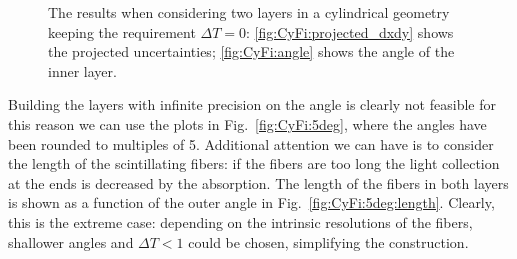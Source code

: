 \begin{refsection}
        \begin{figure}[ht]   
            \centering
            \hfill
            \caption{The results when considering two layers in a cylindrical geometry keeping the requirement $\Delta T=0$: \ref{fig:CyFi:projected_dxdy} shows the projected uncertainties; \ref{fig:CyFi:angle} shows the angle of the inner layer.}
            \label{fig:CyFi}
        \end{figure}
        Building the layers with infinite precision on the angle is clearly not feasible for this reason we can use the plots in Fig.~\ref{fig:CyFi:5deg}, where the angles have been rounded to multiples of \SI{5}{\deg}. 
        Additional attention we can have is to consider the length of the scintillating fibers: if the fibers are too long the light collection at the ends is decreased by the absorption. The length of the fibers in both layers is shown as a function of the outer angle in Fig.~\ref{fig:CyFi:5deg:length}.
        Clearly, this is the extreme case: depending on the intrinsic resolutions of the fibers, shallower angles and $\Delta T<1$ could be chosen, simplifying the construction. 

\end{refsection}
